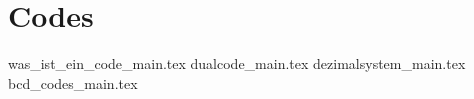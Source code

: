 \part{Codes}

{was_ist_ein_code_main.tex}
{dualcode_main.tex}
{dezimalsystem_main.tex}
{bcd_codes_main.tex}